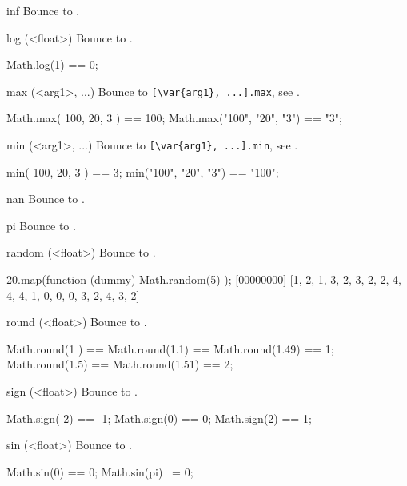 \begin{urbiscriptapi}
\item[inf]
  Bounce to .


\item[log](<float>)%
  Bounce to .
\begin{urbiassert}
Math.log(1) == 0;
\end{urbiassert}


\item[max](<arg1>, ...)%
  Bounce to \lstinline|[\var{arg1}, ...].max|, see .
\begin{urbiassert}
Math.max( 100,   20,   3 ) == 100;
Math.max("100", "20", "3") == "3";
\end{urbiassert}


\item[min](<arg1>, ...)%
  Bounce to \lstinline|[\var{arg1}, ...].min|, see .
\begin{urbiassert}
min( 100,   20,   3 ) ==     3;
min("100", "20", "3") == "100";
\end{urbiassert}


\item[nan]
  Bounce to .


\item[pi]
  Bounce to .


\item[random](<float>)%
  Bounce to .
\begin{urbiscript}
20.map(function (dummy) { Math.random(5) });
[00000000] [1, 2, 1, 3, 2, 3, 2, 2, 4, 4, 4, 1, 0, 0, 0, 3, 2, 4, 3, 2]
\end{urbiscript}


\item[round](<float>)%
  Bounce to .
\begin{urbiassert}
Math.round(1  ) == Math.round(1.1)  == Math.round(1.49) == 1;
Math.round(1.5) == Math.round(1.51) == 2;
\end{urbiassert}


\item[sign](<float>)%
  Bounce to .
\begin{urbiassert}
Math.sign(-2) == -1;  Math.sign(0)  == 0;  Math.sign(2)  == 1;
\end{urbiassert}


\item[sin](<float>)%
  Bounce to .
\begin{urbiassert}
Math.sin(0) == 0;
Math.sin(pi) ~= 0;
\end{urbiassert}



\end{urbiscriptapi}
